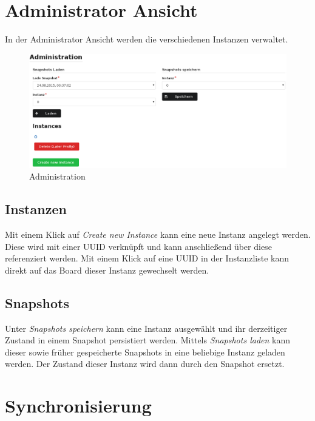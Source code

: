\section{Administrator Ansicht}
\label{sec:admin-ansicht}
In der Administrator Ansicht werden die verschiedenen
Instanzen verwaltet.
\begin{figure}[ht]
  \centering
  \includegraphics[width=\textwidth]{fig/admin.png}
  \caption{Administration}
\end{figure}

\subsection*{Instanzen}
\label{sec:instanzen}
 Mit einem Klick auf \emph{Create new Instance} kann eine
neue Instanz angelegt werden. Diese wird mit einer UUID verknüpft und kann
anschließend über diese referenziert werden. Mit einem Klick auf eine UUID in
der Instanzliste kann direkt auf das Board dieser Instanz gewechselt werden.

\subsection*{Snapshots}
\label{sec:snapshots}
Unter \emph{Snapshots speichern} kann eine Instanz ausgewählt und ihr
derzeitiger Zustand in einem Snapshot persistiert werden.
Mittels \emph{Snapshots laden} kann dieser sowie früher gespeicherte Snapshots
in eine beliebige Instanz geladen werden. Der Zustand dieser Instanz wird dann
durch den Snapshot ersetzt.

\section{Synchronisierung}

